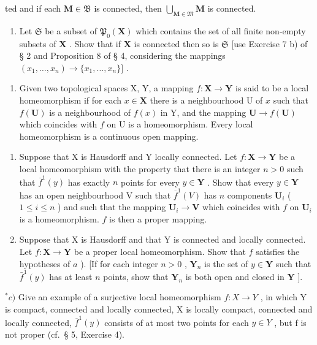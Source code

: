 ted and if each \(\mathbf{M} \in \mathfrak{B}\) is connected, then \(\bigcup_{\mathbf{M} \in \mathfrak{M}} \mathbf{M}\) is connected.

\begin{enumerate}
\def\labelenumi{\alph{enumi})}
\setcounter{enumi}{1}
\tightlist
\item
  Let \(\mathfrak{S}\) be a subset of \(\mathfrak{P}_{0}(\mathbf{X})\) which contains the set of all finite non-empty subsets of \(\mathbf{X}\) . Show that if \(\mathbf{X}\) is connected then so is \(\mathfrak{S}\) {[}use Exercise 7 b) of § 2 and Proposition 8 of § 4, considering the mappings \((x_{1},\ldots ,x_{n})\to \{x_{1},\ldots ,x_{n}\} ]\) .
\end{enumerate}

\begin{enumerate}
\def\labelenumi{\arabic{enumi})}
\setcounter{enumi}{24}
\tightlist
\item
  Given two topological spaces X, Y, a mapping \(f: \mathbf{X} \to \mathbf{Y}\) is said to be a local homeomorphism if for each \(x \in \mathbf{X}\) there is a neighbourhood U of \(x\) such that \(f(\mathbf{U})\) is a neighbourhood of \(f(x)\) in Y, and the mapping \(\mathbf{U} \to f(\mathbf{U})\) which coincides with \(f\) on U is a homeomorphism. Every local homeomorphism is a continuous open mapping.
\end{enumerate}

\begin{enumerate}
\def\labelenumi{\alph{enumi})}
\item
  Suppose that X is Hausdorff and Y locally connected. Let \(f: \mathbf{X} \to \mathbf{Y}\) be a local homeomorphism with the property that there is an integer \(n > 0\) such that \(\overline{f}^1(y)\) has exactly \(n\) points for every \(y \in \mathbf{Y}\) . Show that every \(y \in \mathbf{Y}\) has an open neighbourhood V such that \(\overline{f}^1(V)\) has \(n\) components \(\mathbf{U}_i\) ( \(1 \leqslant i \leqslant n\) ) and such that the mapping \(\mathbf{U}_i \to \mathbf{V}\) which coincides with \(f\) on \(\mathbf{U}_i\) is a homeomorphism. \(f\) is then a proper mapping.
\item
  Suppose that X is Hausdorff and that Y is connected and locally connected. Let \(f: \mathbf{X} \to \mathbf{Y}\) be a proper local homeomorphism. Show that \(f\) satisfies the hypotheses of \(a\) ). {[}If for each integer \(n > 0\) , \(\mathbf{Y}_n\) is the set of \(y \in \mathbf{Y}\) such that \(\bar{f}^1(y)\) has at least \(n\) points, show that \(\mathbf{Y}_n\) is both open and closed in \(\mathbf{Y}\) {]}.
\end{enumerate}

\(^{*}c)\) Give an example of a surjective local homeomorphism \(f: X \to Y\) , in which Y is compact, connected and locally connected, X is locally compact, connected and locally connected, \(\overline{f}^{1}(y)\) consists of at most two points for each \(y \in Y\) , but f is not proper (cf.~§ 5, Exercise 4).
\relax{}

